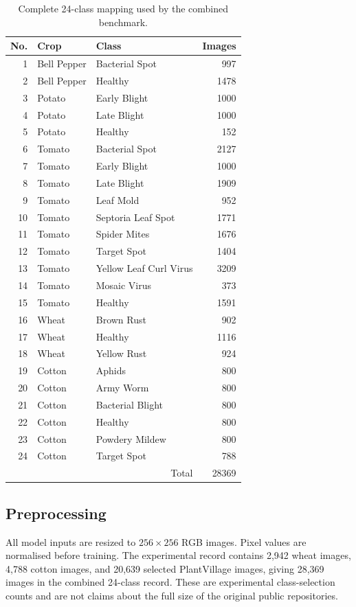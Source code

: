 \documentclass[a4paper,fleqn]{cas-dc}
\begin{document}
\begin{table}[!t]
\centering
\caption{Complete 24-class mapping used by the combined benchmark.}
\label{tab:classes}
\begin{tabular}{rllr}
\toprule
No. & Crop & Class & Images \\
\midrule
1 & Bell Pepper & Bacterial Spot & 997 \\
2 & Bell Pepper & Healthy & 1478 \\
3 & Potato & Early Blight & 1000 \\
4 & Potato & Late Blight & 1000 \\
5 & Potato & Healthy & 152 \\
6 & Tomato & Bacterial Spot & 2127 \\
7 & Tomato & Early Blight & 1000 \\
8 & Tomato & Late Blight & 1909 \\
9 & Tomato & Leaf Mold & 952 \\
10 & Tomato & Septoria Leaf Spot & 1771 \\
11 & Tomato & Spider Mites & 1676 \\
12 & Tomato & Target Spot & 1404 \\
13 & Tomato & Yellow Leaf Curl Virus & 3209 \\
14 & Tomato & Mosaic Virus & 373 \\
15 & Tomato & Healthy & 1591 \\
16 & Wheat & Brown Rust & 902 \\
17 & Wheat & Healthy & 1116 \\
18 & Wheat & Yellow Rust & 924 \\
19 & Cotton & Aphids & 800 \\
20 & Cotton & Army Worm & 800 \\
21 & Cotton & Bacterial Blight & 800 \\
22 & Cotton & Healthy & 800 \\
23 & Cotton & Powdery Mildew & 800 \\
24 & Cotton & Target Spot & 788 \\
\midrule
\multicolumn{3}{r}{Total} & 28369 \\
\bottomrule
\end{tabular}
\end{table}

\subsection{Preprocessing}
All model inputs are resized to $256\times256$ RGB images. Pixel values are normalised before training. The experimental record contains 2,942 wheat images, 4,788 cotton images, and 20,639 selected PlantVillage images, giving 28,369 images in the combined 24-class record. These are experimental class-selection counts and are not claims about the full size of the original public repositories.
\end{document}

